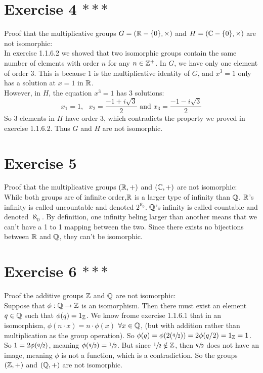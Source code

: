 \documentclass[12pt]{article}
\begin{document}
    \section*{Exercise 4 $***$}
    Proof that the multiplicative groups $G = (\mathbb{R} - \{0\}, \times)$
    and $H = (\mathbb{C} - \{0\}, \times)$ are not isomorphic: \\
    In exercise 1.1.6.2 we showed that two isomorphic groups contain the same
    number of elements with order $n$ for any $n \in \mathbb{Z}^+$.
    In $G$, we have only one element of order 3.
    This is because 1 is the multiplicative identity of $G$,
    and $x^3 = 1$ only has a solution at $x = 1$ in $\mathbb{R}$. \\
    However, in $H$, the equation $x^3 = 1$ has 3 solutions:
    \[x_1 = 1, \text{ } x_2 = \dfrac{-1 + i\sqrt{3}}{2}
    \text{ and } x_3 = \dfrac{-1 - i\sqrt{3}}{2}\]
    So 3 elements in $H$ have order 3,
    which contradicts the property we proved in exercise 1.1.6.2.
    Thus $G$ and $H$ are not isomorphic. 
    

    \section*{Exercise 5}
    Proof that the multiplicative groups $(\mathbb{R}, +)$
    and $(\mathbb{C}, +)$ are not isomorphic: \\
    While both groups are of infinite order,$
    \mathbb{R}$ is a larger type of infinity than $\mathbb{Q}$.
    $\mathbb{R}$'s infinity is called uncountable and denoted $2^{\aleph_0}$.
    $\mathbb{Q}$'s infinity is called countable and denoted $\aleph_0$.
    By definition, one infinity beling larger than another means that
    we can't have a 1 to 1 mapping between the two.
    Since there exists no bijections between $\mathbb{R}$ and $\mathbb{Q}$,
    they can't be isomorphic.


    \section*{Exercise 6 $***$}
    Proof the additive groups $\mathbb{Z}$ and $\mathbb{Q}$ are not isomorphic: \\
    Suppose that $\phi: \mathbb{Q} \to \mathbb{Z}$ is an isomorphism.
    Then there must exist an element $q \in \mathbb{Q}$
    such that $\phi(q) = 1_{\mathbb{Z}}$.
    We know frome exercise 1.1.6.1 that in an isomorphism,
    $\phi(n \cdot x) = n \cdot \phi(x)$ $\forall x \in \mathbb{Q}$,
    (but with addition rather than multiplication as the group operation).
    So $\phi(q) = \phi(2(\sfrac{q}{2})) = 2\phi(q/2) = 1_{\mathbb{Z}} = 1$.
    So $1 = 2\phi(\sfrac{q}{2})$, meaning $\phi(\sfrac{q}{2}) = \sfrac{1}{2}$.
    But since $\sfrac{1}{2} \notin \mathbb{Z}$,
    then $\sfrac{q}{2}$ does not have an image,
    meaning $\phi$ is not a function, which is a contradiction.
    So the groups $(\mathbb{Z}, +)$ and $(\mathbb{Q}, +)$ are not isomorphic.
\end{document}
